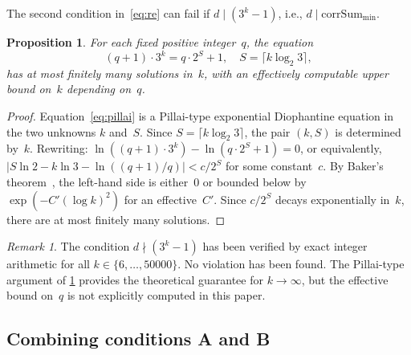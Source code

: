 \documentclass[11pt, a4paper]{amsart}
\theoremstyle{plain}
\newtheorem{proposition}[theorem]{Proposition}
\theoremstyle{definition}
\theoremstyle{remark}
\newtheorem{remark}[theorem]{Remark}
\newcommand{\corrSum}{\mathrm{corrSum}}
\begin{document}
The second condition in~\eqref{eq:re} can fail if $d \mid (3^k - 1)$,
i.e., $d \mid \corrSum_{\min}$.

\begin{proposition}\label{prop:cond-b}
  For each fixed positive integer~$q$, the equation
  \begin{equation}\label{eq:pillai}
    (q+1) \cdot 3^k = q \cdot 2^S + 1,
    \quad S = \lceil k \log_2 3 \rceil,
  \end{equation}
  has at most finitely many solutions in~$k$, with an effectively
  computable upper bound on~$k$ depending on~$q$.
\end{proposition}

\begin{proof}
  Equation~\eqref{eq:pillai} is a Pillai-type exponential
  Diophantine equation in the two unknowns $k$ and~$S$.
  Since $S = \lceil k \log_2 3 \rceil$, the pair $(k, S)$ is
  determined by~$k$.  Rewriting:
  $\ln((q+1) \cdot 3^k) - \ln(q \cdot 2^S + 1) = 0$, or equivalently,
  $|S \ln 2 - k \ln 3 - \ln((q+1)/q)| < c/2^S$ for some constant~$c$.
  By Baker's theorem~\cite{BakerWustholz1993}, the left-hand side
  is either~$0$ or bounded below by $\exp(-C'(\log k)^2)$ for an
  effective~$C'$.  Since $c/2^S$ decays exponentially in~$k$, there
  are at most finitely many solutions.
\end{proof}

\begin{remark}\label{rem:cond-b-verification}
  The condition $d \nmid (3^k - 1)$ has been verified
  by exact integer arithmetic for all $k \in \{6, \ldots, 50000\}$.
  No violation has been found.  The Pillai-type argument of
  \cref{prop:cond-b} provides the theoretical guarantee for
  $k \to \infty$, but the effective bound on~$q$ is not
  explicitly computed in this paper.
\end{remark}

\subsection{Combining conditions A and B}\label{ssec:combining}
\end{document}
